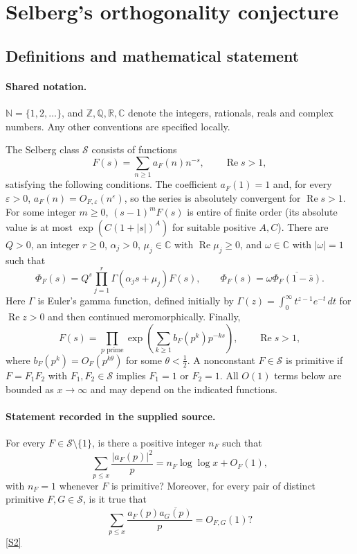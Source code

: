 \documentclass[11pt]{article}
\newcommand{\sref}[2]{\hyperlink{source:#1:#2}{[S#2]}}
\begin{document}
\section{Selberg's orthogonality conjecture}\label{statement}

\subsection{Definitions and mathematical statement}

\paragraph{Shared notation.}$\mathbb N=\{1,2,\ldots\}$, and $\mathbb Z,\mathbb Q,\mathbb R,\mathbb C$ denote the integers, rationals, reals and complex numbers. Any other conventions are specified locally.


The Selberg class $\mathcal S$ consists of functions
\[F(s)=\sum_{n\ge1}a_F(n)n^{-s},\qquad \operatorname{Re}s>1,\]
satisfying the following conditions. The coefficient $a_F(1)=1$ and, for every $\varepsilon>0$, $a_F(n)=O_{F,\varepsilon}(n^\varepsilon)$, so the series is absolutely convergent for $\operatorname{Re}s>1$. For some integer $m\ge0$, $(s-1)^mF(s)$ is entire of finite order (its absolute value is at most $\exp(C(1+|s|)^A)$ for suitable positive $A,C$). There are $Q>0$, an integer $r\ge0$, $\alpha_j>0$, $\mu_j\in\mathbb C$ with $\operatorname{Re}\mu_j\ge0$, and $\omega\in\mathbb C$ with $|\omega|=1$ such that
\[\Phi_F(s)=Q^s\prod_{j=1}^r\Gamma(\alpha_j s+\mu_j)F(s),\qquad \Phi_F(s)=\omega\overline{\Phi_F(1-\overline s)}.\]
Here $\Gamma$ is Euler's gamma function, defined initially by $\Gamma(z)=\int_0^\infty t^{z-1}e^{-t}\,dt$ for $\operatorname{Re}z>0$ and then continued meromorphically. Finally,
\[F(s)=\prod_{p\text{ prime}}\exp\left(\sum_{k\ge1}b_F(p^k)p^{-ks}\right),\qquad \operatorname{Re}s>1,\]
where $b_F(p^k)=O_F(p^{k\theta})$ for some $\theta<\tfrac12$. A nonconstant $F\in\mathcal S$ is primitive if $F=F_1F_2$ with $F_1,F_2\in\mathcal S$ implies $F_1=1$ or $F_2=1$. All $O(1)$ terms below are bounded as $x\to\infty$ and may depend on the indicated functions.
\paragraph{Statement recorded in the supplied source.}
For every $F\in\mathcal S\setminus\{1\}$, is there a positive integer $n_F$ such that
\[\sum_{p\le x}\frac{|a_F(p)|^2}{p}=n_F\log\log x+O_F(1),\]
with $n_F=1$ whenever $F$ is primitive? Moreover, for every pair of distinct primitive $F,G\in\mathcal S$, is it true that
\[\sum_{p\le x}\frac{a_F(p)\overline{a_G(p)}}p=O_{F,G}(1)?\] \sref{statement}{2}
\end{document}

